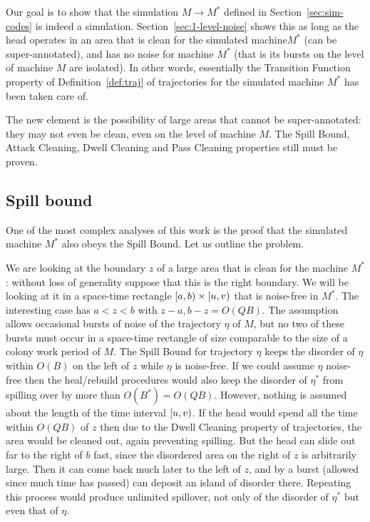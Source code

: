 \documentclass[11pt]{memoir}
\theoremstyle{definition} %
\def\B{B}
\newcommand{\Q}{Q}
\begin{document}
Our goal is to show that the simulation \( M\to M^{*} \)
defined in Section~\ref{sec:sim-codes} is indeed a simulation.
Section~\ref{sec:1-level-noise} shows this as long as the head operates in an
area that is clean for the simulated machine\( M^{*} \) (can be super-annotated), 
and has no noise for machine \( M^{*} \) (that is its bursts on the level of machine \( M \)
are isolated).
In other words, essentially the Transition Function property of Definition~\ref{def:traj} of
trajectories for the simulated machine \( M^{*} \) has been taken care of.

The new element is the possibility of large areas that cannot be super-annotated: they
may not even be clean, even on the level of machine \( M \).
The Spill Bound, Attack Cleaning, Dwell Cleaning and Pass Cleaning properties still must be proven.

\subsection{Spill bound}

One of the most complex analyses of this work is the proof that 
the simulated machine \( M^{*} \) also obeys the Spill Bound.
Let us outline the problem.

We are looking at the boundary \( z \) of a large area that is clean for the
machine \( M^{*} \): without loss of generality suppose that this is the right boundary.
We will be looking at it in a space-time rectangle \( \left[a,b\right)\times\left[u,v\right) \)
that is noise-free in \( M^{*} \).
The interesting case has \( a<z<b \) with \( z-a,b-z=O(\Q\B) \).
The assumption allows occasional bursts of noise of the trajectory \( \eta \) of \( M \),
but no two of these bursts must occur in a space-time rectangle of size comparable to
the size of a colony work period of \( M \).
The Spill Bound for trajectory \( \eta \) keeps the disorder of \( \eta \) within
\( O(\B) \) on the left of \( z \) while \( \eta \) is noise-free.
If we could assume \( \eta \) noise-free then the heal/rebuild procedures would also keep
the disorder of \( \eta^{*} \) from spilling over by more than \( O(\B^{*})=O(\Q\B) \).
However, nothing is assumed about the length of the time interval \( \left[u,v\right) \).
If the head would spend all the time within \( O(\Q\B) \) of \( z \) then due to 
the Dwell Cleaning property of trajectories,  the area would be cleaned out, again
preventing spilling.
But the head can slide out far to the right of \( b \) fast, since
the disordered area on the right of \( z \) is arbitrarily large.
Then it can come back much later to the left of \( z \), and by
a burst (allowed since much time has passed)
can deposit an island of disorder there.
Repeating this process would produce unlimited spillover, not only 
of the disorder of \( \eta^{*} \) but even that of \( \eta \).
\end{document}
